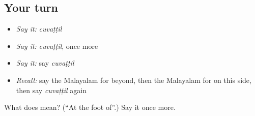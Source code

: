 \subsection*{Your turn}
\begin{itemize}
\raggedright
  \item \emph{Say it:} \emph{cuvaṭṭil}
  \item \emph{Say it:} \emph{cuvaṭṭil}, once more
  \item \emph{Say it:} say \emph{cuvaṭṭil}
  \item \emph{Recall:} say the Malayalam for beyond, then the Malayalam for on this side, then say \emph{cuvaṭṭil} again
\end{itemize}

\begin{tcolorbox}[breakable,colback=teal!4,colframe=teal!35!black,title={Before you move on}]
What does  mean? (\textquotedblleft{}At the foot of\textquotedblright{}.) Say it once more.
\end{tcolorbox}
